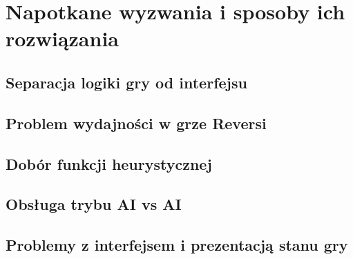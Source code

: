 \chapter{Napotkane wyzwania i sposoby ich rozwiązania}

\section{Separacja logiki gry od interfejsu}

\section{Problem wydajności w grze Reversi}

\section{Dobór funkcji heurystycznej}

\section{Obsługa trybu AI vs AI}

\section{Problemy z interfejsem i prezentacją stanu gry}
